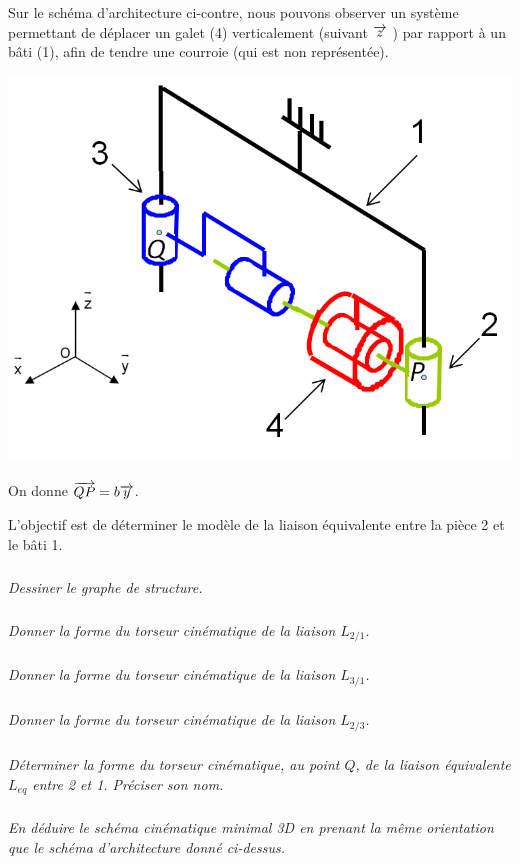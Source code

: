 \documentclass[10pt]{article}
\begin{document}
\noindent\begin{minipage}[c]{.5\linewidth}
Sur le schéma d’architecture ci-contre, nous
pouvons observer un système permettant de
déplacer un galet (4) verticalement (suivant $\overrightarrow{z}$ )
par rapport à un bâti (1), afin de tendre une
courroie (qui est non représentée).

\end{minipage} \hfill
\begin{minipage}[c]{.45\linewidth}
\begin{center}
\includegraphics[width=.9\textwidth]{images/fig01_6}
\end{center}
\end{minipage}

\vspace{.5cm}

On donne $\overrightarrow{QP}=b\overrightarrow{y}$.

L’objectif est de déterminer le modèle de la liaison équivalente entre la pièce 2 et le bâti 1.

\subparagraph{}
\textit{Dessiner le graphe de structure.}

\subparagraph{}
\textit{Donner la forme du torseur cinématique de la liaison $L_{2/1}$.}

\subparagraph{}
\textit{Donner la forme du torseur cinématique de la liaison $L_{3/1}$.}

\subparagraph{}
\textit{Donner la forme du torseur cinématique de la liaison $L_{2/3}$.}

\subparagraph{}
\textit{Déterminer la forme du torseur cinématique, au point $Q$, de la liaison équivalente $L_{eq}$ entre 2 et 1. Préciser son nom.}

\subparagraph{}
\textit{En déduire le schéma cinématique minimal 3D en prenant la même orientation que le schéma d'architecture donné ci-dessus.}
\end{document}
